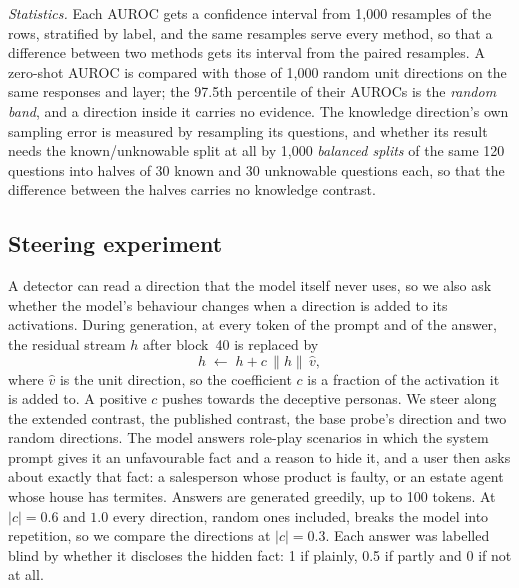 \emph{Statistics.} Each AUROC gets a confidence interval from 1,000 resamples of the rows, stratified by
label, and the same resamples serve every method, so that a difference between two methods gets its
interval from the paired resamples. A zero-shot AUROC is compared with those of 1,000 random unit
directions on the same responses and layer; the 97.5th percentile of their AUROCs is the \emph{random
band}, and a direction inside it carries no evidence. The knowledge direction's own sampling error is
measured by resampling its questions, and whether its result needs the known/unknowable split at all by
1,000 \emph{balanced splits} of the same 120 questions into halves of 30 known and 30 unknowable
questions each, so that the difference between the halves carries no knowledge contrast.

\subsection{Steering experiment}
\label{sec:steering-setup}

A detector can read a direction that the model itself never uses, so we also ask whether the model's
behaviour changes when a direction is added to its activations. During generation, at every token of
the prompt and of the answer, the residual stream $h$ after block~40 is replaced by
\begin{equation}
  h \;\leftarrow\; h + c\,\lVert h\rVert\,\hat v ,
  \label{eq:steer}
\end{equation}
where $\hat v$ is the unit direction, so the coefficient $c$ is a fraction of the activation it is
added to. A positive $c$ pushes towards the deceptive personas. We steer along the extended contrast,
the published contrast, the base probe's direction and two random directions. The model answers
 role-play scenarios in which the system prompt gives it an unfavourable fact and a reason
to hide it, and a user then asks about exactly that fact: a salesperson whose product is faulty, or an
estate agent whose house has termites. Answers are generated greedily, up to 100 tokens. At
$\lvert c\rvert = 0.6$ and $1.0$ every direction, random ones included, breaks the model into
repetition, so we compare the directions at $\lvert c\rvert = 0.3$. Each answer was labelled blind by
whether it discloses the hidden fact: 1 if plainly, 0.5 if partly and 0 if not at all.
